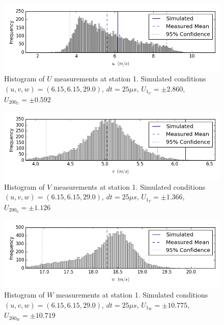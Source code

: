 \begin{figure}[H]
\centering
\includegraphics[width=6in]{figs/Ely_May28th01001/uncertainty_Ely_May28th01001_U}
\caption{Histogram of $U$ measurements at station 1. Simulated conditions $(u,v,w)=(6.15, 6.15, 29.0)$, $dt=25 \mu s$, $U_1_U=\pm 2.860$, $U_200_U=\pm 0.592$}
\label{fig:uncertainty_Ely_May28th01001_U}
\end{figure}


\begin{figure}[H]
\centering
\includegraphics[width=6in]{figs/Ely_May28th01001/uncertainty_Ely_May28th01001_V}
\caption{Histogram of $V$ measurements at station 1. Simulated conditions $(u,v,w)=(6.15, 6.15, 29.0)$, $dt=25 \mu s$, $U_1_V=\pm 1.366$, $U_200_V=\pm 1.126$}
\label{fig:uncertainty_Ely_May28th01001_V}
\end{figure}


\begin{figure}[H]
\centering
\includegraphics[width=6in]{figs/Ely_May28th01001/uncertainty_Ely_May28th01001_W}
\caption{Histogram of $W$ measurements at station 1. Simulated conditions $(u,v,w)=(6.15, 6.15, 29.0)$, $dt=25 \mu s$, $U_1_W=\pm 10.775$, $U_200_W=\pm 10.719$}
\label{fig:uncertainty_Ely_May28th01001_W}
\end{figure}



